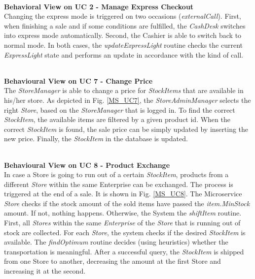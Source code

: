 		\noindent
		\\
		\textbf{Behavioral View on UC 2 - Manage Express Checkout} \\
		Changing the express mode is triggered on two occasions (\textit{externalCall}). First, when finishing a sale and if some conditions are fulfilled, the \textit{CashDesk} switches into express mode automatically. Second, the Cashier is able to switch back to normal mode. In both cases, the \textit{updateExpressLight} routine checks the current \textit{ExpressLight} state and performs an update in accordance with the kind of call.
		
       
		
		\noindent
		\\
		\textbf{Behavioural View on UC 7 - Change Price} \\
		The \textit{StoreManager} is able to change a price for \textit{StockItems} that are available in his/her store. As depicted in Fig. \ref{MS_UC7}, the \textit{StoreAdminManager} selects the right \textit{Store}, based on the \textit{StoreManager} that is logged in. To find the correct \textit{StockItem}, the available items are filtered by a given product id. When the correct \textit{StockItem} is found, the sale price can be simply updated by inserting the new price. Finally, the \textit{StockItem} in the database is updated.
		
		\noindent
		\\
		\textbf{Behavioural View on UC 8 - Product Exchange} \\
		In case a Store is going to run out of a certain \textit{StockItem}, products from a different \textit{Store} within the same Enterprise can be exchanged. The process  is triggered at the end of a sale. It is shown in  Fig. \ref{MS_UC8}. The Microservice \textit{Store} checks if the stock amount of the sold items have passed the \textit{item.MinStock} amount. If not, nothing happens. Otherwise, the System the \textit{shiftItem} routine. First, all \textit{Stores} within the same \textit{Enterprise} of the \textit{Store} that is running out of stock are collected. For each \textit{Store}, the system checks if the desired \textit{StockItem} is available. The \textit{findOptimum} routine decides (using heuristics) whether the transportation is meaningful. After a successful query, the \textit{StockItem} is shipped from one Store to another, decreasing the amount at the first Store and increasing it at the second.

